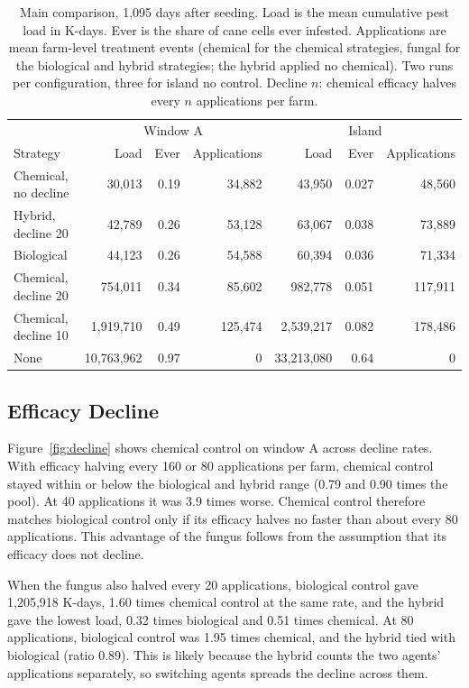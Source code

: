 \begin{table}[!htbp]
\vspace{2ex}
\centering
\small
\caption{Main comparison, 1,095 days after seeding. Load is the mean cumulative pest load in K-days. Ever is the share of cane cells ever infested. Applications are mean farm-level treatment events (chemical for the chemical strategies, fungal for the biological and hybrid strategies; the hybrid applied no chemical). Two runs per configuration, three for island no control. Decline $n$: chemical efficacy halves every $n$ applications per farm.}
\label{table:results}
\begin{tabular}{lrrrrrr}
\hline\hline
 & \multicolumn{3}{c}{Window A} & \multicolumn{3}{c}{Island} \\
Strategy & Load & Ever & Applications & Load & Ever & Applications \\ \hline
Chemical, no decline & 30,013 & 0.19 & 34,882 & 43,950 & 0.027 & 48,560 \\
Hybrid, decline 20 & 42,789 & 0.26 & 53,128 & 63,067 & 0.038 & 73,889 \\
Biological & 44,123 & 0.26 & 54,588 & 60,394 & 0.036 & 71,334 \\
Chemical, decline 20 & 754,011 & 0.34 & 85,602 & 982,778 & 0.051 & 117,911 \\
Chemical, decline 10 & 1,919,710 & 0.49 & 125,474 & 2,539,217 & 0.082 & 178,486 \\
None & 10,763,962 & 0.97 & 0 & 33,213,080 & 0.64 & 0 \\
\hline\hline
\end{tabular}
\end{table}

\subsection{Efficacy Decline}

Figure~\ref{fig:decline} shows chemical control on window A across decline rates. With efficacy halving every 160 or 80 applications per farm, chemical control stayed within or below the biological and hybrid range (0.79 and 0.90 times the pool). At 40 applications it was 3.9 times worse. Chemical control therefore matches biological control only if its efficacy halves no faster than about every 80 applications. This advantage of the fungus follows from the assumption that its efficacy does not decline.

When the fungus also halved every 20 applications, biological control gave 1,205,918 K-days, 1.60 times chemical control at the same rate, and the hybrid gave the lowest load, 0.32 times biological and 0.51 times chemical. At 80 applications, biological control was 1.95 times chemical, and the hybrid tied with biological (ratio 0.89). This is likely because the hybrid counts the two agents' applications separately, so switching agents spreads the decline across them.

